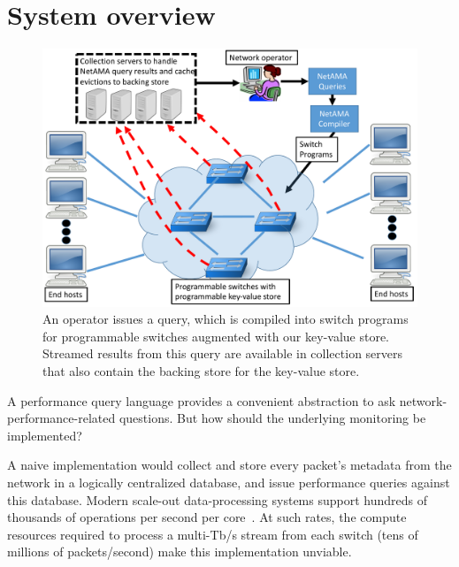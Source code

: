 \section{System overview}
\label{s:overview}
\begin{figure}[!t]
\centering
\includegraphics[width=0.7\columnwidth]{pq_overview.pdf}
\caption{An operator issues a \TheSystem query, which is compiled into
switch programs for programmable switches augmented with our
key-value store. Streamed results from this query are available in
collection servers that also contain the backing store for the key-value
store.}
\label{fig:overview}
\end{figure}

A performance query language provides a convenient abstraction to ask
network-performance-related questions. But how should the underlying monitoring
be implemented?

A naive implementation would collect and store every packet's metadata
from the network in a logically centralized database, and issue performance
queries against this database. %
Modern scale-out data-processing systems support hundreds of thousands of
operations per second per core~\cite{kafka_benchmark, redis_benchmark,
  memcached_benchmark, redis_vs_memcached, redis_vs_memcached_update}. At such
rates, the compute resources required to process a multi-Tb/s stream from each
switch (tens of millions of packets/second) make this implementation
unviable.

